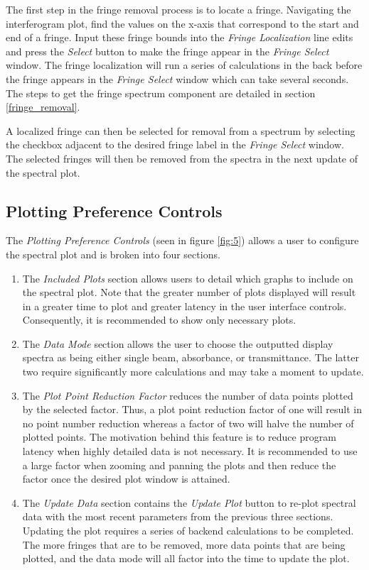 \documentclass[a4paper, 12pt]{report}
\begin{document}
    The first step in the fringe removal process is to locate a fringe. Navigating the interferogram plot, find the values on the x-axis that correspond to the start and end of a fringe. Input these fringe bounds into the \textit{Fringe Localization} line edits and press the \textit{Select} button to make the fringe appear in the \textit{Fringe Select} window. The fringe localization will run a series of calculations in the back before the fringe appears in the \textit{Fringe Select} window which can take several seconds. The steps to get the fringe spectrum component are detailed in section \ref{fringe_removal}.
    
    A localized fringe can then be selected for removal from a spectrum by selecting the checkbox adjacent to the desired fringe label in the \textit{Fringe Select} window. The selected fringes will then be removed from the spectra in the next update of the spectral plot.
    
    \subsection{Plotting Preference Controls}
    
    The \textit{Plotting Preference Controls} (seen in figure \ref{fig:5}) allows a user to configure the spectral plot and is broken into four sections.
    
    \begin{enumerate}
        \item The \textit{Included Plots} section allows users to detail which graphs to include on the spectral plot. Note that the greater number of plots displayed will result in a greater time to plot and greater latency in the user interface controls. Consequently, it is recommended to show only necessary plots.
        \item The \textit{Data Mode} section allows the user to choose the outputted display spectra as being either single beam, absorbance, or transmittance. The latter two require significantly more calculations and may take a moment to update.
        \item The \textit{Plot Point Reduction Factor} reduces the number of data points plotted by the selected factor. Thus, a plot point reduction factor of one will result in no point number reduction whereas a factor of two will halve the number of plotted points. The motivation behind this feature is to reduce program latency when highly detailed data is not necessary. It is recommended to use a large factor when zooming and panning the plots and then reduce the factor once the desired plot window is attained.
        \item The \textit{Update Data} section contains the \textit{Update Plot} button to re-plot spectral data with the most recent parameters from the previous three sections. Updating the plot requires a series of backend calculations to be completed. The more fringes that are to be removed, more data points that are being plotted, and the data mode will all factor into the time to update the plot.
    \end{enumerate}
    
\end{document}

